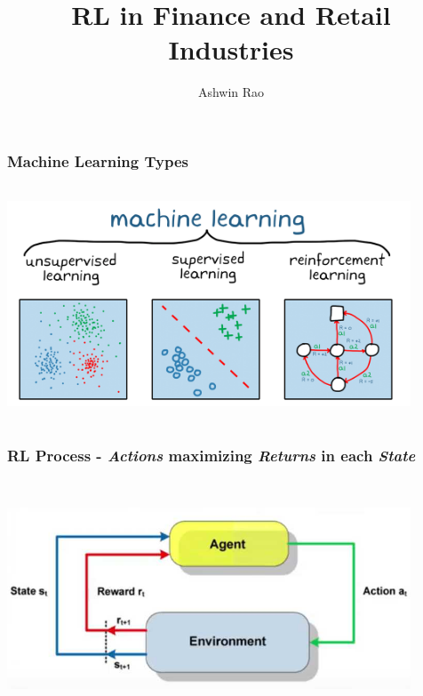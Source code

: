 \documentclass[handout]{beamer}
\title[RL for Finance and Retail]{RL in Finance and Retail Industries} %
\author{Ashwin Rao} %
\institute[Stanford] %
{Stanford University
}
\date{} %
\begin{document}
\begin{frame}
\titlepage %
\end{frame}


\begin{frame}
\frametitle{Machine Learning Types}
\begin{center}
\includegraphics[width=12cm, height=7cm]{ml_types.png}
\end{center}
\end{frame}


\begin{frame}
\frametitle{RL Process - {\em Actions} maximizing {\em Returns} in each {\em State}}
\begin{center}
\includegraphics[width=12cm, height=7cm]{RL_diagram.jpg}
\end{center}
\end{frame}
\end{document}
